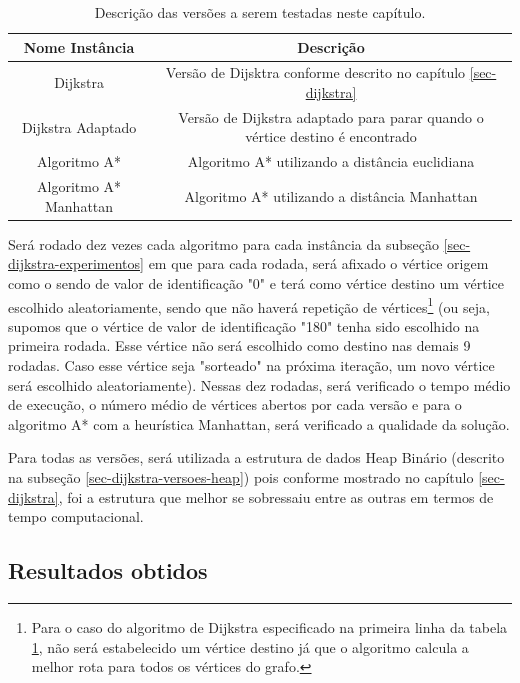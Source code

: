 \begin{table}[H]
\caption{Descrição das versões a serem testadas neste capítulo.}
\label{tbl-aestrela-instancias}
\centering
\begin{adjustbox}{max width=\textwidth}
\begin{tabular}{|c|c|}
\hline 
\textbf{Nome Instância} & \textbf{Descrição} \\ 
\hline 
Dijkstra & Versão de Dijsktra conforme descrito no capítulo \ref{sec-dijkstra} \\ 
\hline 
Dijkstra Adaptado & Versão de Dijkstra adaptado para parar quando o vértice destino é encontrado \\ 
\hline 
Algoritmo A* & Algoritmo A* utilizando a distância euclidiana \\ 
\hline 
Algoritmo A* Manhattan & Algoritmo A* utilizando a distância Manhattan \\ 
\hline 
\end{tabular} 
\end{adjustbox}
\end{table}

Será rodado dez vezes cada algoritmo para cada instância da subseção \ref{sec-dijkstra-experimentos} em que para cada rodada, será afixado o vértice origem como o sendo de valor de identificação "0" e terá como vértice destino um vértice escolhido aleatoriamente, sendo que não haverá repetição de vértices\footnote{Para o caso do algoritmo de Dijkstra especificado na primeira linha da tabela \ref{tbl-aestrela-instancias}, não será estabelecido um vértice destino já que o algoritmo calcula a melhor rota para todos os vértices do grafo.} (ou seja, supomos que o vértice de valor de identificação "180" tenha sido escolhido na primeira rodada. Esse vértice não será escolhido como destino nas demais 9 rodadas. Caso esse vértice seja "sorteado" na próxima iteração, um novo vértice será escolhido aleatoriamente). Nessas dez rodadas, será verificado o tempo médio de execução, o número médio de vértices abertos por cada versão e para o algoritmo A* com a heurística Manhattan, será verificado a qualidade da solução.

Para todas as versões, será utilizada a estrutura de dados Heap Binário (descrito na subseção \ref{sec-dijkstra-versoes-heap}) pois conforme mostrado no capítulo \ref{sec-dijkstra}, foi a estrutura que melhor se sobressaiu entre as outras em termos de tempo computacional.

\subsection{Resultados obtidos}
\label{sec-aestrela-instancias-resultados}

